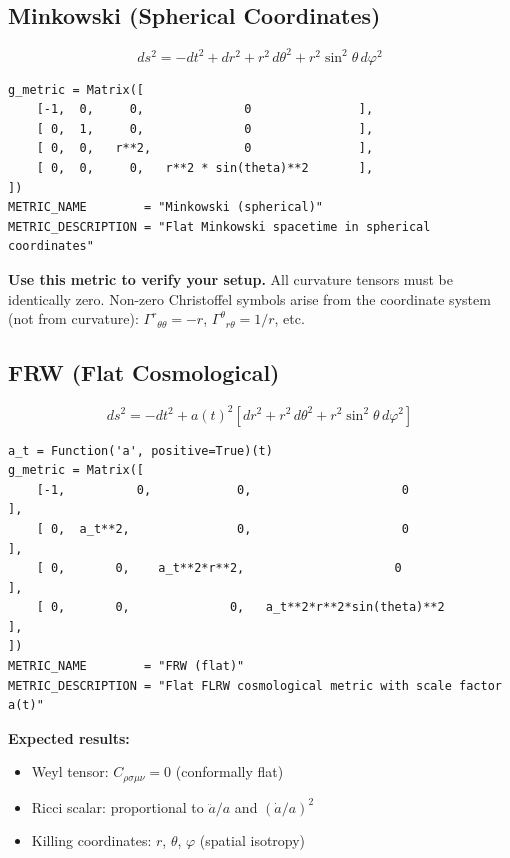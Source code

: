 \documentclass[11pt,a4paper]{article}
\renewcommand{\Gamma}{\varGamma}
\begin{document}
\subsection{Minkowski (Spherical Coordinates)}
\label{sec:m-mink}

\[
  ds^2 = -dt^2 + dr^2 + r^2\,d\theta^2 + r^2\sin^2\!\theta\,d\varphi^2
\]

\begin{lstlisting}
g_metric = Matrix([
    [-1,  0,     0,              0               ],
    [ 0,  1,     0,              0               ],
    [ 0,  0,   r**2,             0               ],
    [ 0,  0,     0,   r**2 * sin(theta)**2       ],
])
METRIC_NAME        = "Minkowski (spherical)"
METRIC_DESCRIPTION = "Flat Minkowski spacetime in spherical coordinates"
\end{lstlisting}

\textbf{Use this metric to verify your setup.}  All curvature tensors must
be identically zero.  Non-zero Christoffel symbols arise from the coordinate
system (not from curvature):
$\Gamma^r{}_{\theta\theta} = -r$,
$\Gamma^\theta{}_{r\theta} = 1/r$, etc.

\subsection{FRW (Flat Cosmological)}
\label{sec:m-frw}

\[
  ds^2 = -dt^2 + a(t)^2\!\left[dr^2 + r^2\,d\theta^2
          + r^2\sin^2\!\theta\,d\varphi^2\right]
\]

\begin{lstlisting}
a_t = Function('a', positive=True)(t)
g_metric = Matrix([
    [-1,          0,            0,                     0              ],
    [ 0,  a_t**2,               0,                     0              ],
    [ 0,       0,    a_t**2*r**2,                     0              ],
    [ 0,       0,              0,   a_t**2*r**2*sin(theta)**2        ],
])
METRIC_NAME        = "FRW (flat)"
METRIC_DESCRIPTION = "Flat FLRW cosmological metric with scale factor a(t)"
\end{lstlisting}

\textbf{Expected results:}
\begin{itemize}
  \item Weyl tensor: $C_{\rho\sigma\mu\nu} = 0$ (conformally flat)
  \item Ricci scalar: proportional to $\ddot{a}/a$ and $(\dot{a}/a)^2$
  \item Killing coordinates: $r$, $\theta$, $\varphi$ (spatial isotropy)
\end{itemize}
\end{document}
